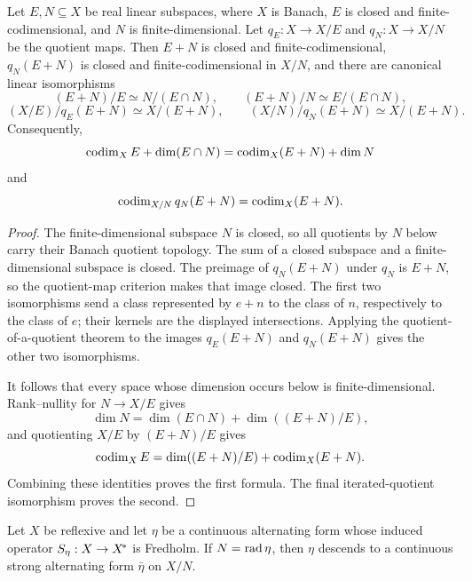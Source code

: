 \begin{lemma}\label{lem:sum-quotient-package}
Let $E,N\subseteq X$ be real linear subspaces, where $X$ is Banach, $E$ is closed and
finite-codimensional, and $N$ is finite-dimensional. Let $q_E:X\to X/E$ and
$q_N:X\to X/N$ be the quotient maps. Then $E+N$ is closed and finite-codimensional,
$q_N(E+N)$ is closed and finite-codimensional in $X/N$, and there are canonical linear
isomorphisms
\[
 (E+N)/E\simeq N/(E\cap N),\qquad
 (E+N)/N\simeq E/(E\cap N),
\]
\[
 (X/E)/q_E(E+N)\simeq X/(E+N),\qquad
 (X/N)/q_N(E+N)\simeq X/(E+N).
\]
Consequently,
\[
 \operatorname{codim}_XE+\dim(E\cap N)=\operatorname{codim}_X(E+N)+\dim N
\]
and
\[
 \operatorname{codim}_{X/N}q_N(E+N)=\operatorname{codim}_X(E+N).
\]
\leanok
\end{lemma}

\begin{proof}
The finite-dimensional subspace $N$ is closed, so all quotients by $N$ below carry their Banach
quotient topology. The sum of a closed subspace and a finite-dimensional subspace is closed. The
preimage of $q_N(E+N)$ under $q_N$ is $E+N$, so the quotient-map criterion makes that image closed.
The first two isomorphisms send a class represented by $e+n$ to the class of $n$, respectively to
the class of $e$; their kernels are the displayed intersections. Applying the
quotient-of-a-quotient theorem to the images $q_E(E+N)$ and $q_N(E+N)$ gives the other two
isomorphisms.

It follows that every space whose dimension occurs below is finite-dimensional.
Rank--nullity for $N\to X/E$ gives
\[
 \dim N=\dim(E\cap N)+\dim((E+N)/E),
\]
and quotienting $X/E$ by $(E+N)/E$ gives
\[
 \operatorname{codim}_XE=\dim((E+N)/E)+\operatorname{codim}_X(E+N).
\]
Combining these identities proves the first formula. The final iterated-quotient isomorphism proves
the second.
\end{proof}

\begin{lemma}
\label{lem:fredholm-quotient-strong}
Let $X$ be reflexive and let $\eta$ be a continuous alternating form whose induced operator
$S_\eta:X\to{X}^{\!*}$ is Fredholm. If $N=\operatorname{rad}\eta$, then $\eta$ descends to a continuous
strong alternating form $\bar\eta$ on $X/N$.
\leanok
\end{lemma}

